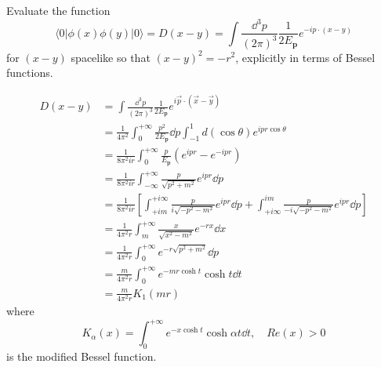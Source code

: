 \problem Evaluate the function
\begin{equation*}
    \langle 0 | \phi(x) \phi(y) |0 \rangle = D(x - y) = \int \frac{\dd^3p}{(2\pi)^3} \frac{1}{2E_\mathbf{p}} e^{-ip \cdot (x - y)}
\end{equation*}
for $(x - y)$ spacelike so that $(x - y)^2 = -r^2$, explicitly in terms of Bessel functions.

\solution
\begin{align*}
    D(x - y) & = \int \frac{\dd^3p}{(2\pi)^3} \frac{1}{2E_{\mathbf{p}}} e^{i\vec{p}\cdot(\vec{x} - \vec{y})}\\
    & = \frac{1}{4\pi^2} \int_0^{+\infty} \frac{p^2}{2E_{\mathbf{p}}} \dd p \int_{-1}^1 d(\cos\theta) e^{ipr\cos\theta}\\
    & = \frac{1}{8\pi^2ir} \int_0^{+\infty} \frac{p}{E_{\mathbf{p}}} \left(e^{ipr} - e^{-ipr}\right)\\
    & = \frac{1}{8\pi^2ir} \int_{-\infty}^{+\infty} \frac{p}{\sqrt{p^2 + m^2}} e^{ipr} \dd p\\
    & = \frac{1}{8\pi^2ir} \left[\int_{+im}^{+i\infty} \frac{p}{i\sqrt{-p^2 - m^2}} e^{ipr} \dd p + \int_{+i\infty}^{im} \frac{p}{-i\sqrt{-p^2 - m^2}} e^{ipr} \dd p \right]\\
    & = \frac{1}{4\pi^2r} \int_m^{+\infty} \frac{x}{\sqrt{x^2 - m^2}} e^{-rx} \dd x\\
    & = \frac{1}{4\pi^2r} \int_0^{+\infty} e^{-r\sqrt{p^2 + m^2}} \dd p\\
    & = \frac{m}{4\pi^2r} \int_0^{+\infty} e^{-mr\cosh t} \cosh t \dd t\\
    & = \frac{m}{4\pi^2r} K_1(mr)
\end{align*}
where 
\begin{equation*}
    K_\alpha(x) = \int_0^{+\infty} e^{-x\cosh t} \cosh{\alpha t} \dd t, \quad Re(x) > 0
\end{equation*}
is the modified Bessel function.